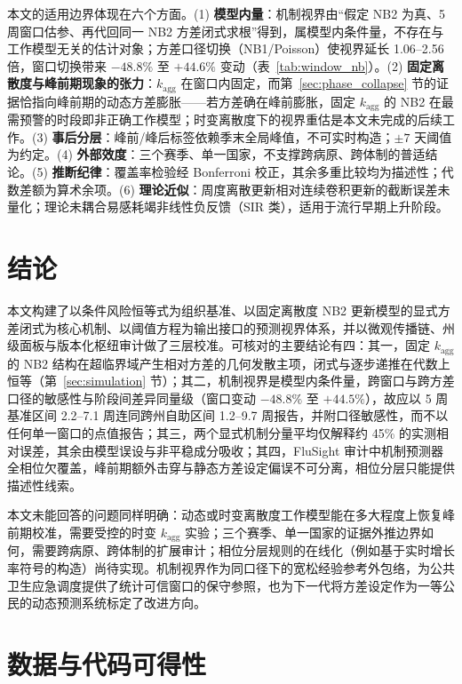 \documentclass[10pt,UTF8,a4paper,zihao=-4]{ctexart}
\theoremstyle{plain}
\theoremstyle{remark}
\begin{document}
本文的适用边界体现在六个方面。(1) \textbf{模型内量}：机制视界由“假定 NB2 为真、5 周窗口估参、再代回同一 NB2 方差闭式求根”得到，属模型内条件量，不存在与工作模型无关的估计对象；方差口径切换（NB1/Poisson）使视界延长 1.06--2.56 倍，窗口切换带来 $-48.8\%$ 至 $+44.6\%$ 变动（表~\ref{tab:window_nb}）。(2) \textbf{固定离散度与峰前期现象的张力}：$k_{\text{agg}}$ 在窗口内固定，而第~\ref{sec:phase_collapse} 节的证据恰指向峰前期的动态方差膨胀——若方差确在峰前膨胀，固定 $k_{\text{agg}}$ 的 NB2 在最需预警的时段即非正确工作模型；时变离散度下的视界重估是本文未完成的后续工作。(3) \textbf{事后分层}：峰前/峰后标签依赖季末全局峰值，不可实时构造；$\pm 7$ 天阈值为约定。(4) \textbf{外部效度}：三个赛季、单一国家，不支撑跨病原、跨体制的普适结论。(5) \textbf{推断纪律}：覆盖率检验经 Bonferroni 校正，其余多重比较均为描述性；代数差额为算术余项。(6) \textbf{理论近似}：周度离散更新相对连续卷积更新的截断误差未量化；理论未耦合易感耗竭非线性负反馈（SIR 类），适用于流行早期上升阶段。

\section{结论}\label{sec:conclusion}

本文构建了以条件风险恒等式为组织基准、以固定离散度 NB2 更新模型的显式方差闭式为核心机制、以阈值方程为输出接口的预测视界体系，并以微观传播链、州级面板与版本化枢纽审计做了三层校准。可核对的主要结论有四：其一，固定 $k_{\text{agg}}$ 的 NB2 结构在超临界域产生相对方差的几何发散主项，闭式与逐步递推在代数上恒等（第~\ref{sec:simulation} 节）；其二，机制视界是模型内条件量，跨窗口与跨方差口径的敏感性与阶段间差异同量级（窗口变动 $-48.8\%$ 至 $+44.5\%$），故应以 5 周基准区间 2.2--7.1 周连同跨州自助区间 1.2--9.7 周报告，并附口径敏感性，而不以任何单一窗口的点值报告；其三，两个显式机制分量平均仅解释约 45\% 的实测相对误差，其余由模型误设与非平稳成分吸收；其四，FluSight 审计中机制预测器全相位欠覆盖，峰前期额外击穿与静态方差设定偏误不可分离，相位分层只能提供描述性线索。

本文未能回答的问题同样明确：动态或时变离散度工作模型能在多大程度上恢复峰前期校准，需要受控的时变 $k_{\text{agg}}$ 实验；三个赛季、单一国家的证据外推边界如何，需要跨病原、跨体制的扩展审计；相位分层规则的在线化（例如基于实时增长率符号的构造）尚待实现。机制视界作为同口径下的宽松经验参考外包络，为公共卫生应急调度提供了统计可信窗口的保守参照，也为下一代将方差设定作为一等公民的动态预测系统标定了改进方向。

\section*{数据与代码可得性}
\end{document}
